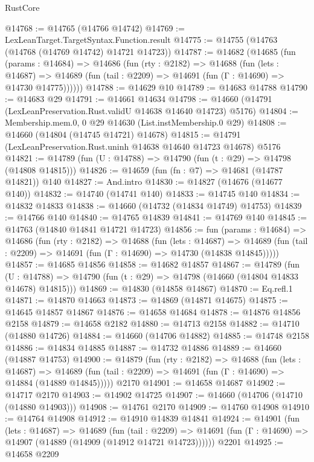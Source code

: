 \begin{lexlean}{RustCore}
\begin{coremodule}
@14768 := @14765 (@14766 @14742)
@14769 := LexLeanTarget.TargetSyntax.Function.result
@14775 := @14755 (@14763 (@14768 (@14769 @14742) @14721 @14723))
@14787 := @14682
    (@14685
      (fun (params : @14684) =>
      @14686
        (fun (rty : @2182) =>
        @14688
          (fun (lets : @14687) =>
          @14689 (fun (tail : @2209) => @14691 (fun (Γ : @14690) => @14730 @14775))))))
@14788 := @14629 @10
@14789 := @14683 @14788
@14790 := @14683 @29
@14791 := @14661 @14634
@14798 := @14660 (@14791 (LexLeanPreservation.Rust.validU @14638 @14640 @14723) @5176)
@14804 := Membership.mem.{0, 0} @29 @14630 (List.instMembership.{0} @29)
@14808 := @14660 (@14804 (@14745 @14721) @14678)
@14815 := @14791 (LexLeanPreservation.Rust.uninh @14638 @14640 @14723 @14678) @5176
@14821 := @14789 (fun (U : @14788) => @14790 (fun (t : @29) => @14798 (@14808 @14815)))
@14826 := @14659 (fun (fn : @7) => @14681 (@14787 @14821)) @140
@14827 := And.intro
@14830 := @14827 (@14676 (@14677 @140))
@14832 := @14740 (@14741 @140)
@14833 := @14745 @140
@14834 := @14832 @14833
@14838 := @14660 (@14732 (@14834 @14749) @14753)
@14839 := @14766 @140
@14840 := @14765 @14839
@14841 := @14769 @140
@14845 := @14763 (@14840 @14841 @14721 @14723)
@14856 := fun (params : @14684) =>
  @14686
    (fun (rty : @2182) =>
    @14688
      (fun (lets : @14687) =>
      @14689 (fun (tail : @2209) => @14691 (fun (Γ : @14690) => @14730 (@14838 @14845)))))
@14857 := @14685 @14856
@14858 := @14682 @14857
@14867 := @14789
    (fun (U : @14788) => @14790 (fun (t : @29) => @14798 (@14660 (@14804 @14833 @14678) @14815)))
@14869 := @14830 (@14858 @14867)
@14870 := Eq.refl.{1}
@14871 := @14870 @14663
@14873 := @14869 (@14871 @14675)
@14875 := @14645 @14857 @14867
@14876 := @14658 @14684
@14878 := @14876 @14856 @2158
@14879 := @14658 @2182
@14880 := @14713 @2158
@14882 := @14710 (@14880 @14726)
@14884 := @14660 (@14706 @14882)
@14885 := @14748 @2158
@14886 := @14834 @14885
@14887 := @14732 @14886
@14889 := @14660 (@14887 @14753)
@14900 := @14879
    (fun (rty : @2182) =>
    @14688
      (fun (lets : @14687) =>
      @14689 (fun (tail : @2209) => @14691 (fun (Γ : @14690) => @14884 (@14889 @14845)))))
    @2170
@14901 := @14658 @14687
@14902 := @14717 @2170
@14903 := @14902 @14725
@14907 := @14660 (@14706 (@14710 (@14880 @14903)))
@14908 := @14761 @2170
@14909 := @14760 @14908
@14910 := @14764 @14908
@14912 := @14910 @14839 @14841
@14924 := @14901
    (fun (lets : @14687) =>
    @14689
      (fun (tail : @2209) =>
      @14691 (fun (Γ : @14690) => @14907 (@14889 (@14909 (@14912 @14721 @14723))))))
    @2201
@14925 := @14658 @2209

\end{coremodule}
\end{lexlean}
